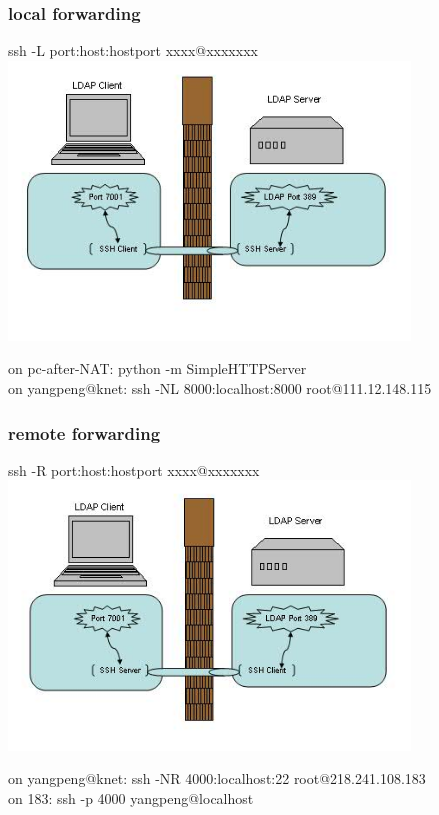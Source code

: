 \documentclass{beamer}
\begin{document}
\begin{frame}
  \frametitle{local forwarding}

  ssh -L port:host:hostport xxxx@xxxxxxx \\

  \pause
  \includegraphics[width=0.8\textwidth,height=0.6\textheight]{local.jpg}

  \pause
  on pc-after-NAT: python -m SimpleHTTPServer \\
  \pause
  on yangpeng@knet: ssh -NL 8000:localhost:8000 root@111.12.148.115 \\

\end{frame}


\begin{frame}
  \frametitle{remote forwarding}

  ssh -R port:host:hostport xxxx@xxxxxxx \\

  \pause
  \includegraphics[width=0.8\textwidth,height=0.6\textheight]{remote.jpg}

  \pause
  on yangpeng@knet: ssh -NR 4000:localhost:22 root@218.241.108.183 \\
  \pause
  on 183: ssh -p 4000 yangpeng@localhost \\

\end{frame}
\end{document}
